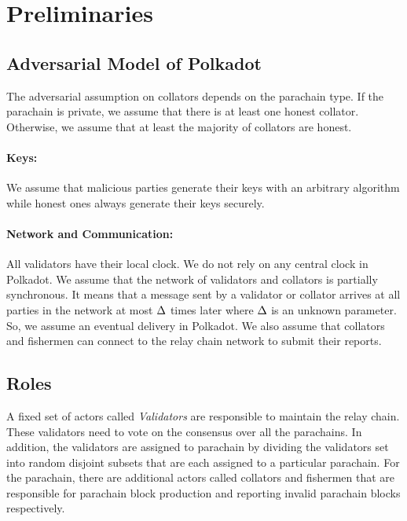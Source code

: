 \section{Preliminaries}

\subsection{Adversarial Model of Polkadot}




The adversarial assumption on collators depends on the parachain type. If the parachain is private, we assume that there is at least one honest collator. Otherwise, we assume that at least the majority of collators are honest.

\paragraph{Keys:} We assume that malicious parties generate their keys with an arbitrary algorithm while honest ones always generate their keys securely.

\paragraph{Network and Communication:} All validators have their local clock. We do not rely on any central clock in Polkadot. We assume that the network of validators and collators is partially synchronous. It means that a message sent by a validator or collator arrives at all parties in the network at most $\Delta$ times later where $\Delta$ is an unknown parameter. So, we assume an eventual delivery in Polkadot.
We also assume that collators and fishermen can connect to the relay chain network to submit their reports.

\subsection{Roles}
A fixed set of actors called \emph{Validators} are responsible to maintain the relay chain.
These validators need to vote on the consensus over all the parachains.
In addition, the validators are assigned to parachain by dividing the validators set into
random disjoint subsets that are each assigned to a particular parachain.
For the parachain, there are additional actors called collators and fishermen that are
responsible for parachain block production and reporting invalid parachain blocks respectively.